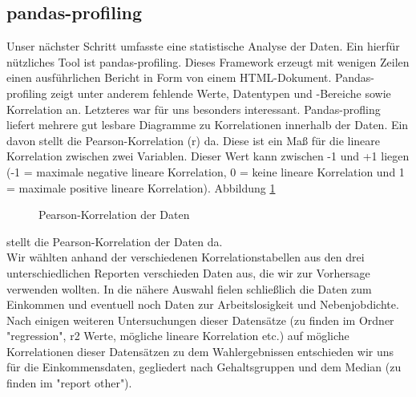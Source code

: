 \documentclass[a4paper,10pt]{scrartcl}
\begin{document}
\subsection{pandas-profiling}
Unser nächster Schritt umfasste eine statistische Analyse der Daten. Ein hierfür nützliches Tool ist pandas-profiling. Dieses Framework erzeugt mit wenigen Zeilen einen ausführlichen Bericht in Form von einem HTML-Dokument. Pandas-profiling zeigt unter anderem fehlende Werte, Datentypen und -Bereiche sowie Korrelation an. Letzteres war für uns besonders interessant. Pandas-profling liefert mehrere gut lesbare Diagramme zu Korrelationen innerhalb der Daten. Ein davon stellt die Pearson-Korrelation (r) da. Diese ist ein Maß für die lineare Korrelation zwischen zwei Variablen. Dieser Wert kann zwischen -1 und +1 liegen (-1 = maximale negative lineare Korrelation, 0 = keine lineare Korrelation und 1 =  maximale positive lineare Korrelation). Abbildung \ref{fig:correlation}\begin{figure}
	\centering
	\caption{Pearson-Korrelation der Daten}
	\label{fig:correlation}
\end{figure}
 stellt die Pearson-Korrelation der Daten da.\\
 Wir wählten anhand der verschiedenen Korrelationstabellen aus den drei unterschiedlichen Reporten verschieden Daten aus, die wir zur Vorhersage verwenden wollten. In die nähere Auswahl fielen schließlich die Daten zum Einkommen und eventuell noch Daten zur Arbeitslosigkeit und Nebenjobdichte. Nach einigen weiteren Untersuchungen dieser Datensätze (zu finden im Ordner "regression", r2 Werte, mögliche lineare Korrelation etc.) auf mögliche Korrelationen dieser Datensätzen zu dem Wahlergebnissen entschieden wir uns für die Einkommensdaten, gegliedert nach Gehaltsgruppen und dem Median (zu finden im "report other").\\     
 
\end{document}
